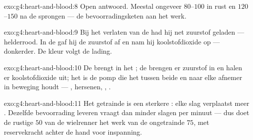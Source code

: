 \begin{solution}{exo:g4:heart-and-blood:8}
Open antwoord. Meestal ongeveer $80$--$100$ in rust en $120$--$150$ na
de sprongen --- de bevoorradingsketen aan het werk.
\end{solution}

\begin{solution}{exo:g4:heart-and-blood:9}
Bij het verlaten van de  had hij net zuurstof geladen ---
helderrood. In de  gaf hij de zuurstof af en nam hij
koolstofdioxide op --- donkerder. De kleur volgt de lading.
\end{solution}

\begin{solution}{exo:g4:heart-and-blood:10}
De  brengt  in het ; de  brengen er
zuurstof in en halen er koolstofdioxide uit; het  is de pomp die het
 tussen beide en naar elke afnemer in beweging houdt --- ,
hersenen, , .
\end{solution}

\begin{solution}{exo:g4:heart-and-blood:11}
Het getrainde  is een sterkere : elke slag verplaatst meer
. Dezelfde bevoorrading leveren vraagt dan minder slagen per minuut
--- dus doet de rustige $50$ van de wielrenner het werk van de
ongetrainde $75$, met reservekracht achter de hand voor inspanning.
\end{solution}
